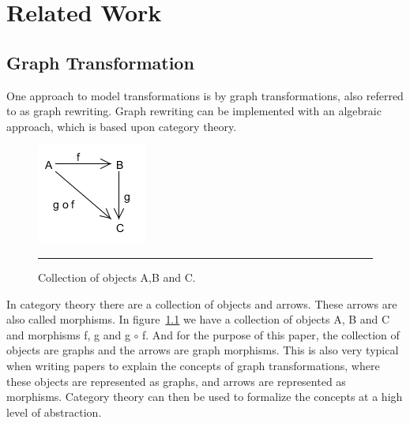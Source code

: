 \chapter{Related Work} %

\label{Chapter 2} %



\section{Graph Transformation}
\noindent One approach to model transformations is by graph transformations,
also referred to as graph rewriting. Graph rewriting can be implemented with
an algebraic approach, which is based upon category theory\cite{Barr1990}.

\begin{figure}[htbp]
  \centering
    \includegraphics{./Figures/categoryTheory.png}
    \rule{35em}{0.5pt}
  \caption[Collection of objects for category theroy graph]{Collection of
  objects A,B and C.}
  \label{fig:categoryTheory}
\end{figure}


In category theory there are a collection of objects and arrows. These arrows
are also called morphisms. In figure~\ref{fig:categoryTheory} we have a
collection of objects A, B and C and morphisms f, g and g $\circ$ f. And for the
purpose of this paper, the collection of objects are graphs and the arrows are
graph morphisms. This is also very typical when writing papers to explain the
concepts of graph transformations, where these objects are represented as
graphs, and arrows are represented as morphisms. Category theory can then be
used to formalize the concepts at a high level of abstraction.

